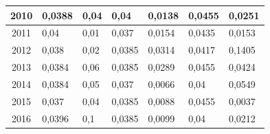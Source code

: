 \begin{table}[H]
\begin{tabular}{|c|l|l|l|l|l|l|}
		2010            & 0,0388                                                 & 0,04                                                    & 0,04                                                       & 0,0138                                                    & 0,0455                                                      & 0,0251                                                      \\ \hline
		2011            & 0,04                                                   & 0,01                                                    & 0,037                                                      & 0,0154                                                    & 0,0435                                                      & 0,0153                                                      \\ \hline
		2012            & 0,038                                                  & 0,02                                                    & 0,0385                                                     & 0,0314                                                    & 0,0417                                                      & 0,1405                                                      \\ \hline
		2013            & 0,0384                                                 & 0,06                                                    & 0,0385                                                     & 0,0289                                                    & 0,0455                                                      & 0,0424                                                      \\ \hline
		2014            & 0,0384                                                 & 0,05                                                    & 0,037                                                      & 0,0066                                                    & 0,04                                                        & 0,0549                                                      \\ \hline
		2015            & 0,037                                                  & 0,04                                                    & 0,0385                                                     & 0,0088                                                    & 0,0455                                                      & 0,0037                                                      \\ \hline
		2016            & 0,0396                                                 & 0,1                                                     & 0,0385                                                     & 0,0099                                                    & 0,04                                                        & 0,0212                                                      \\ \hline

\end{tabular}
\end{table}
